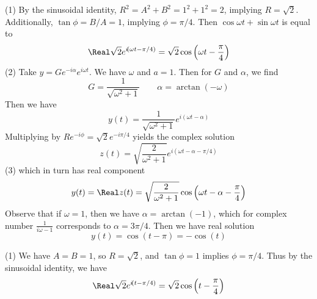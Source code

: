 \documentclass[a4paper]{article}
\begin{document}

(1) By the sinusoidal identity, \(R^{2} = A^{2} + B^{2} = 1^{2} + 1^{2} = 2\), implying \(R = \sqrt{2}\). Additionally, \(\tan \phi = B/A = 1\), implying \(\phi = \pi / 4\). Then \(\cos \omega t + \sin \omega t\) is equal to
\[
	\Real \sqrt{2} e^{i \!\left( \omega t - \pi / 4 \right) } = \sqrt{2} \cos\left( \omega t - \frac{\pi }{4} \right)
\]
(2) Take \(y = Ge^{-i \alpha } e^{i \omega t}\). We have \(\omega \) and \(a = 1\). Then for \(G\) and \(\alpha \), we find
\[
	G = \frac{1}{\sqrt{\omega^{2} + 1}} \qquad \alpha = \arctan \!\left( -\omega  \right)  
\]
Then we have
\[
	y \!\left( t \right)  = \frac{1}{\sqrt{\omega^{2} + 1}} e^{i \!\left(\omega t - \alpha  \right)}
\]
Multiplying by \(Re^{-i \phi } = \sqrt{2} e^{- i\pi / 4 }\) yields the complex solution
\[
	z \!\left( t \right)  = \sqrt{\frac{2}{\omega^{2} + 1}}e^{i \!\left( \omega t - \alpha - \pi / 4 \right) } 
\]
(3) which in turn has real component
\[
	y \!\left( t \right) = \Real z \!\left( t \right) = \sqrt{\frac{2}{\omega^{2} + 1}} \cos\left( \omega t - \alpha - \frac{\pi }{4} \right)
\]
Observe that if \(\omega = 1\), then we have \(\alpha = \arctan \!\left( -1 \right) \), which for complex number \(\displaystyle{\frac{1}{i \omega - 1}}\) corresponds to \(\alpha = 3 \pi / 4\). Then we have real solution
\[
	y \!\left( t \right) = \cos\left( t - \pi  \right) = - \cos\left( t \right)
\]


(1) We have \(A = B = 1\), so \(R = \sqrt{2}\), and \(\tan \phi = 1\) implies \(\phi = \pi / 4\). Thus by the sinusoidal identity, we have
\[
	\Real \sqrt{2} e^{i \!\left( t - \pi / 4 \right) } = \sqrt{2} \cos\left( t - \frac{\pi }{4} \right)
\]
\end{document}
